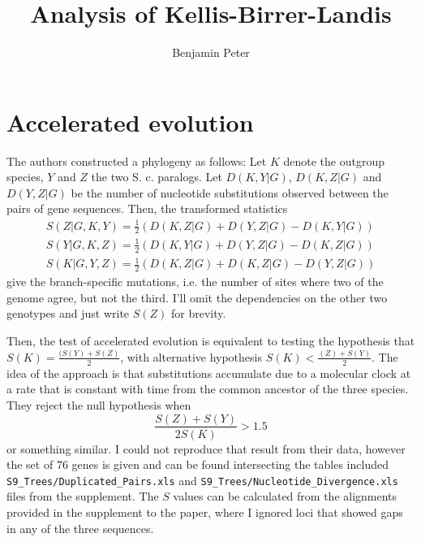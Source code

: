 \documentclass[10pt,letterpaper]{article}
\author{Benjamin Peter}
\title{Analysis of Kellis-Birrer-Landis}
\begin{document}
\maketitle

\section{Accelerated evolution}
The authors constructed a phylogeny as follows: Let $K$ denote the outgroup species, $Y$ and $Z$ the two S. c. paralogs. Let $D(K,Y|G)$, $D(K,Z|G)$ and $D(Y,Z|G)$ be the number of nucleotide substitutions observed between the pairs of gene sequences. Then, the transformed statistics
\begin{equation*}
\begin{split}
S(Z |G, K,Y) = \frac{1}{2}(D(K,Z|G)+D(Y,Z|G)-D(K,Y|G))\\
S(Y |G, K,Z) = \frac{1}{2}(D(K,Y|G)+D(Y,Z|G)-D(K,Z|G))\\
S(K |G, Y,Z) = \frac{1}{2}(D(K,Z|G)+D(K,Z|G)-D(Y,Z|G))
\end{split}
\end{equation*}
give the branch-specific mutations, i.e. the number of sites where two of the genome agree, but not the third. I'll omit the dependencies on the other two genotypes and just write $S(Z)$ for brevity.

Then, the test of accelerated evolution is equivalent to testing the hypothesis that $S(K)=\frac{(S(Y)+S(Z)}{2}$, with alternative hypothesis $S(K)<\frac{(Z)+S(Y)}{2}$. The idea of the approach is that substitutions accumulate due to a molecular clock at a rate that is constant with time from the common ancestor of the three species. They reject the null hypothesis when
\begin{equation*}
\frac{S(Z)+S(Y)}{2 S(K)} > 1.5
\end{equation*}
or something similar. I could not reproduce that result from their data, however the set of 76 genes is given and can be found intersecting the tables included \texttt{S9\_Trees/Duplicated\_Pairs.xls} and         
\texttt{S9\_Trees/Nucleotide\_Divergence.xls} files from the supplement. The $S$ values can be calculated from the alignments provided in the supplement to the paper, where I ignored loci that showed gaps in any of the three sequences.
\end{document}
